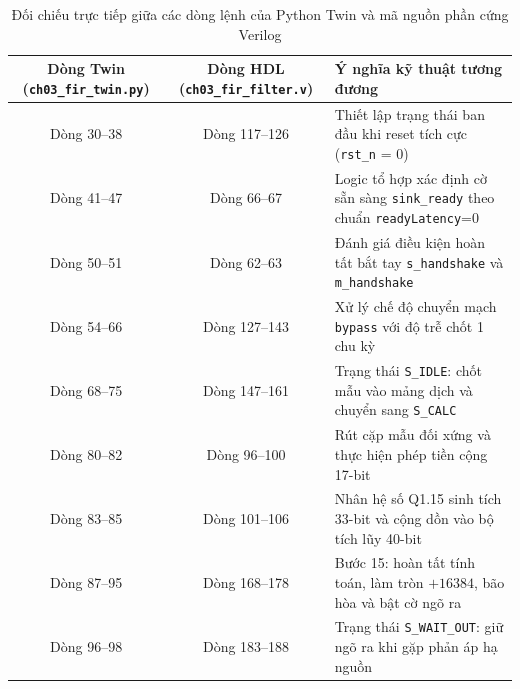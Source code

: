 \begin{table}[htbp]
\centering
\small
\setlength{\tabcolsep}{4pt}
\caption{Đối chiếu trực tiếp giữa các dòng lệnh của Python Twin và mã nguồn phần cứng Verilog}
\label{tab:ch03_twin_vs_hdl}
\begin{tabularx}{\textwidth}{ccX}
\toprule
Dòng Twin (\texttt{ch03\_fir\_twin.py}) & Dòng HDL (\texttt{ch03\_fir\_filter.v}) & Ý nghĩa kỹ thuật tương đương \\
\midrule
Dòng 30--38 & Dòng 117--126 & Thiết lập trạng thái ban đầu khi reset tích cực (\texttt{rst\_n} = 0) \\
Dòng 41--47 & Dòng 66--67 & Logic tổ hợp xác định cờ sẵn sàng \texttt{sink\_ready} theo chuẩn \texttt{readyLatency}=0 \\
Dòng 50--51 & Dòng 62--63 & Đánh giá điều kiện hoàn tất bắt tay \texttt{s\_handshake} và \texttt{m\_handshake} \\
Dòng 54--66 & Dòng 127--143 & Xử lý chế độ chuyển mạch \texttt{bypass} với độ trễ chốt 1 chu kỳ \\
Dòng 68--75 & Dòng 147--161 & Trạng thái \texttt{S\_IDLE}: chốt mẫu vào mảng dịch và chuyển sang \texttt{S\_CALC} \\
Dòng 80--82 & Dòng 96--100 & Rút cặp mẫu đối xứng và thực hiện phép tiền cộng 17-bit \\
Dòng 83--85 & Dòng 101--106 & Nhân hệ số Q1.15 sinh tích 33-bit và cộng dồn vào bộ tích lũy 40-bit \\
Dòng 87--95 & Dòng 168--178 & Bước 15: hoàn tất tính toán, làm tròn $+16384$, bão hòa và bật cờ ngõ ra \\
Dòng 96--98 & Dòng 183--188 & Trạng thái \texttt{S\_WAIT\_OUT}: giữ ngõ ra khi gặp phản áp hạ nguồn \\
\bottomrule
\end{tabularx}
\end{table}

